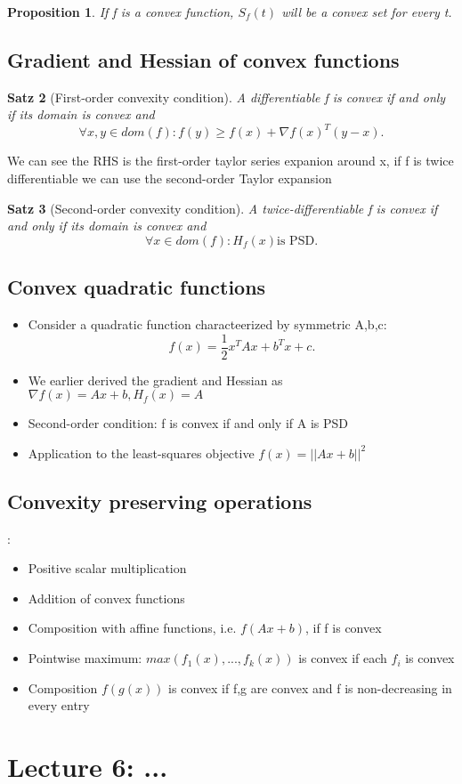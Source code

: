 \documentclass[11pt]{article}
\newtheorem{theorem}{Satz}
\newtheorem{proposition}[theorem]{Proposition}
\begin{document}
\begin{proposition}
    If f is a convex function, $S_f(t)$ will be a convex set for every t. 
\end{proposition}


\subsection*{Gradient and Hessian of convex functions}
\begin{theorem}[First-order convexity condition]
    A differentiable f is convex if and only if its domain is convex and \[
    \forall x,y\in dom(f): f(y)  \geq f(x) + \nabla f(x)^T (y-x)
    .\] 
    
\end{theorem}

We can see the RHS is the first-order taylor series expanion around x, if f is twice differentiable we can use the second-order Taylor expansion

\begin{theorem}[Second-order convexity condition]
    A twice-differentiable f is convex if and only if its domain is convex and \[
    \forall x\in dom(f): H_f(x) \text{is PSD}
    .\] 
    
\end{theorem}

\subsection*{Convex quadratic functions}
\begin{itemize}
    \item Consider a quadratic function characteerized by symmetric A,b,c: \[
    f(x) = \frac{1}{2}x^T Ax + b^Tx + c
    .\] 
    \item We earlier derived the gradient and Hessian as $\nabla f(x) = Ax + b, H_f(x) = A$
    \item Second-order condition: f is convex if and only if A is PSD
    \item Application to the least-squares objective $f(x) = ||Ax+b||^2$  
\end{itemize}

\subsection*{Convexity preserving operations}:
\begin{itemize}
    \item Positive scalar multiplication
    \item Addition of convex functions
    \item Composition with affine functions, i.e. $f(Ax+b)$, if f is convex
    \item Pointwise maximum: $max(f_1(x), ..., f_k(x))$ is convex if each $f_i$ is convex
    \item Composition $f(g(x))$ is convex if f,g are convex and f is non-decreasing in every entry   
\end{itemize}

\section{Lecture 6: ...} %
\end{document}
